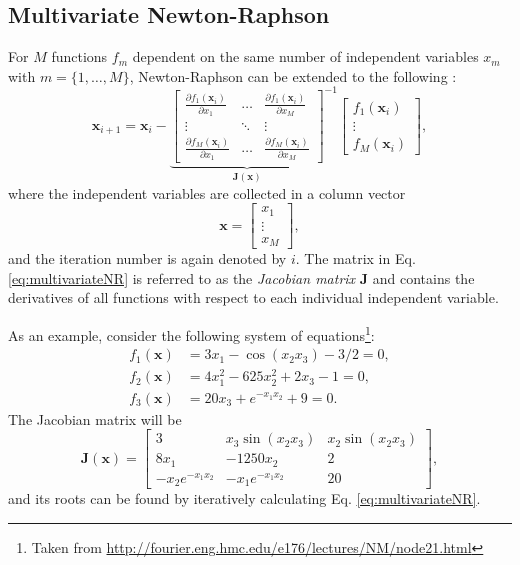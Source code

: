 \subsection{Multivariate Newton-Raphson}\label{sec:multivariateNR}
For $M$ functions $f_m$ dependent on the same number of independent variables $x_m$ with $m = \{1, \hdots, M\}$,  Newton-Raphson can be extended to the following \SWcomment[citation?]:
\begin{equation}\label{eq:multivariateNR}
    \mathbf{x}_{i+1} = 
    \mathbf{x}_i - 
    {\underbrace{\begin{bmatrix}
        \frac{\partial f_1(\mathbf{x}_i)}{\partial x_1} & \hdots & \frac{\partial f_1(\mathbf{x}_i)}{\partial x_M}\\
        \vdots & \ddots & \vdots\\
        \frac{\partial f_M(\mathbf{x}_i)}{\partial x_1} & \hdots & \frac{\partial f_M(\mathbf{x}_i)}{\partial x_M}
    \end{bmatrix}}_{\mathbf{J}(\mathbf{x})}}^{-1}
    \begin{bmatrix}
        f_1(\mathbf{x}_i)\\
        \vdots\\
        f_M(\mathbf{x}_i)
    \end{bmatrix},
\end{equation}
where the independent variables are collected in a column vector
\begin{equation}
    \mathbf{x} = \begin{bmatrix}
        x_1\\
        \vdots\\
        x_M
    \end{bmatrix},
\end{equation}
and the iteration number is again denoted by $i$.
The matrix in Eq. \eqref{eq:multivariateNR} is referred to as the \textit{Jacobian matrix} $\mathbf{J}$ and contains the derivatives of all functions with respect to each individual independent variable. 

As an example, consider the following system of equations\footnote{Taken from \url{http://fourier.eng.hmc.edu/e176/lectures/NM/node21.html}}:
\begin{subequations}
    \begin{align}
        f_1(\mathbf{x}) &= 3 x_1 - \cos(x_2x_3) - 3/2 = 0,\\
        f_2(\mathbf{x}) &= 4x_1^2 - 625 x_2^2 + 2x_3-1 = 0,\\
        f_3(\mathbf{x}) &= 20 x_3 + e^{-x_1x_2}+9 = 0.
    \end{align} 
\end{subequations}
The Jacobian matrix will be 
\begin{equation*}
    \mathbf{J}(\mathbf{x}) = \begin{bmatrix}
        3 & x_3 \sin (x_2x_3) & x_2 \sin(x_2x_3)\\
        8x_1 & -1250 x_2 & 2\\
        -x_2e^{-x_1x_2} & -x_1e^{-x_1x_2} & 20
    \end{bmatrix},
\end{equation*}
and its roots can be found by iteratively calculating Eq. \eqref{eq:multivariateNR}.

